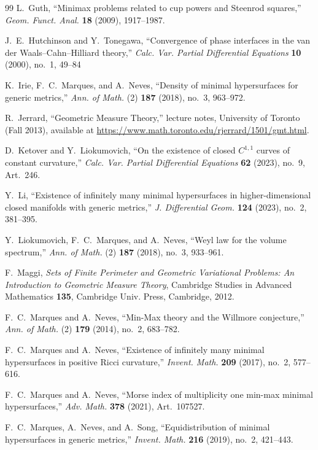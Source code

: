 \documentclass[12pt,english]{article}
\theoremstyle{definition}
\begin{document}
\begin{thebibliography}{99}
 L.~Guth, ``Minimax problems related to cup powers and Steenrod squares,'' \textit{Geom. Funct. Anal.} \textbf{18} (2009), 1917--1987.

 J.~E.~Hutchinson and Y.~Tonegawa, ``Convergence of phase interfaces in the van der Waals--Cahn--Hilliard theory,'' \textit{Calc. Var. Partial Differential Equations} \textbf{10} (2000), no.~1, 49--84

 K.~Irie, F.~C.~Marques, and A.~Neves, ``Density of minimal hypersurfaces for generic metrics,'' \textit{Ann. of Math.} (2) \textbf{187} (2018), no.~3, 963--972.

 R.~Jerrard, ``Geometric Measure Theory,'' lecture notes, University of Toronto (Fall 2013), available at \url{https://www.math.toronto.edu/rjerrard/1501/gmt.html}.

 D.~Ketover and Y.~Liokumovich, ``On the existence of closed $C^{1,1}$ curves of constant curvature,'' \textit{Calc. Var. Partial Differential Equations} \textbf{62} (2023), no.~9, Art.~246.

 Y.~Li, ``Existence of infinitely many minimal hypersurfaces in higher-dimensional closed manifolds with generic metrics,'' \textit{J. Differential Geom.} \textbf{124} (2023), no.~2, 381--395.

 Y.~Liokumovich, F.~C.~Marques, and A.~Neves, ``Weyl law for the volume spectrum,'' \textit{Ann. of Math.} (2) \textbf{187} (2018), no.~3, 933--961.

 F.~Maggi, \textit{Sets of Finite Perimeter and Geometric Variational Problems: An Introduction to Geometric Measure Theory}, Cambridge Studies in Advanced Mathematics \textbf{135}, Cambridge Univ. Press, Cambridge, 2012.

 F.~C.~Marques and A.~Neves, ``Min-Max theory and the Willmore conjecture,'' \textit{Ann. of Math.} (2) \textbf{179} (2014), no.~2, 683--782.

 F.~C.~Marques and A.~Neves, ``Existence of infinitely many minimal hypersurfaces in positive Ricci curvature,'' \textit{Invent. Math.} \textbf{209} (2017), no.~2, 577--616.

 F.~C.~Marques and A.~Neves, ``Morse index of multiplicity one min-max minimal hypersurfaces,'' \textit{Adv. Math.} \textbf{378} (2021), Art.~107527.

 F.~C.~Marques, A.~Neves, and A.~Song, ``Equidistribution of minimal hypersurfaces in generic metrics,'' \textit{Invent. Math.} \textbf{216} (2019), no.~2, 421--443.


\end{thebibliography}
\end{document}
